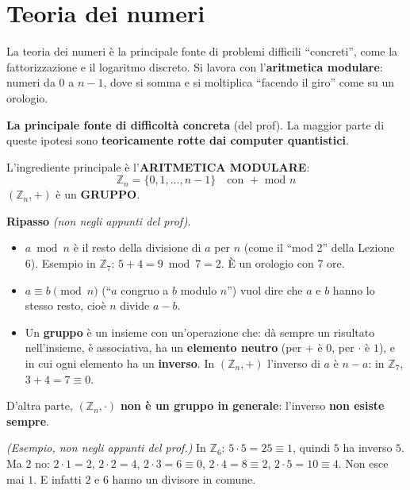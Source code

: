 \section{Teoria dei numeri}

\begin{inbreve}
La teoria dei numeri è la principale fonte di problemi difficili ``concreti'', come la fattorizzazione e il logaritmo discreto. Si lavora con l'\textbf{aritmetica modulare}: numeri da \(0\) a \(n-1\), dove si somma e si moltiplica ``facendo il giro'' come su un orologio.
\end{inbreve}

\textbf{La principale fonte di difficoltà concreta} (del prof). La maggior parte di queste ipotesi sono \textbf{teoricamente rotte dai computer quantistici}.

L'ingrediente principale è l'\textbf{ARITMETICA MODULARE}:
\[
\mathbb{Z}_n = \{0, 1, \dots, n-1\} \quad \text{con } + \text{ mod } n
\]
\((\mathbb{Z}_n, +)\) è un \textbf{GRUPPO}.

\begin{nota}
\textbf{Ripasso} \emph{(non negli appunti del prof)}.
\begin{itemize}
  \item \textbf{\(a \bmod n\)} è il resto della divisione di \(a\) per \(n\) (come il ``mod 2'' della Lezione 6). Esempio in \(\mathbb{Z}_7\): \(5 + 4 = 9 \bmod 7 = 2\). È un orologio con 7 ore.
  \item \(a \equiv b \pmod n\) (``\(a\) congruo a \(b\) modulo \(n\)'') vuol dire che \(a\) e \(b\) hanno lo stesso resto, cioè \(n\) divide \(a - b\).
  \item Un \textbf{gruppo} è un insieme con un'operazione che: dà sempre un risultato nell'insieme, è associativa, ha un \textbf{elemento neutro} (per \(+\) è \(0\), per \(\cdot\) è \(1\)), e in cui ogni elemento ha un \textbf{inverso}. In \((\mathbb{Z}_n, +)\) l'inverso di \(a\) è \(n - a\): in \(\mathbb{Z}_7\), \(3 + 4 = 7 \equiv 0\).
\end{itemize}
\end{nota}

D'altra parte, \((\mathbb{Z}_n, \cdot)\) \textbf{non è un gruppo in generale}: l'inverso \textbf{non esiste sempre}.

\emph{(Esempio, non negli appunti del prof.)} In \(\mathbb{Z}_6\): \(5 \cdot 5 = 25 \equiv 1\), quindi \(5\) ha inverso \(5\). Ma \(2\) no: \(2 \cdot 1 = 2\), \(2 \cdot 2 = 4\), \(2 \cdot 3 = 6 \equiv 0\), \(2 \cdot 4 = 8 \equiv 2\), \(2 \cdot 5 = 10 \equiv 4\). Non esce mai \(1\). E infatti \(2\) e \(6\) hanno un divisore in comune.

